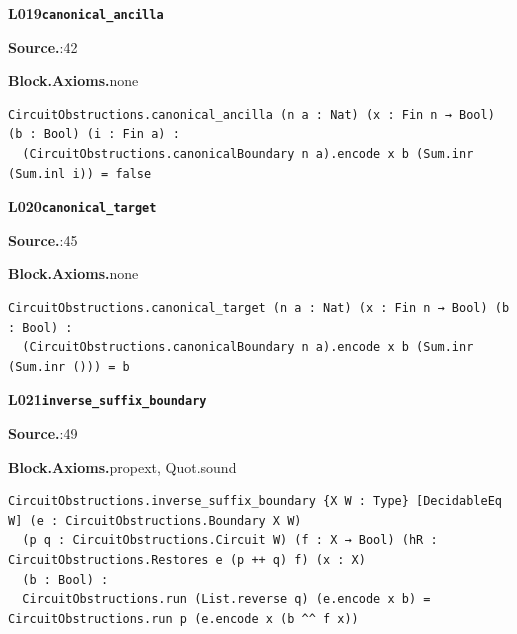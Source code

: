 \par\medskip\noindent\begin{minipage}{\textwidth}
{\small\bfseries L019\enspace\texttt{canonical\_ancilla}\par}
{\footnotesize\raggedright\textbf{Source.}\enspace{}:42\par
\textbf{Block.}\quad\textbf{Axioms.}\enspace none\par}\nopagebreak
\begin{lstlisting}
CircuitObstructions.canonical_ancilla (n a : Nat) (x : Fin n → Bool) (b : Bool) (i : Fin a) :
  (CircuitObstructions.canonicalBoundary n a).encode x b (Sum.inr (Sum.inl i)) = false
\end{lstlisting}
\end{minipage}\par

\par\medskip\noindent\begin{minipage}{\textwidth}
{\small\bfseries L020\enspace\texttt{canonical\_target}\par}
{\footnotesize\raggedright\textbf{Source.}\enspace{}:45\par
\textbf{Block.}\quad\textbf{Axioms.}\enspace none\par}\nopagebreak
\begin{lstlisting}
CircuitObstructions.canonical_target (n a : Nat) (x : Fin n → Bool) (b : Bool) :
  (CircuitObstructions.canonicalBoundary n a).encode x b (Sum.inr (Sum.inr ())) = b
\end{lstlisting}
\end{minipage}\par

\par\medskip\noindent\begin{minipage}{\textwidth}
{\small\bfseries L021\enspace\texttt{inverse\_suffix\_boundary}\par}
{\footnotesize\raggedright\textbf{Source.}\enspace{}:49\par
\textbf{Block.}\quad\textbf{Axioms.}\enspace propext, Quot.sound\par}\nopagebreak
\begin{lstlisting}
CircuitObstructions.inverse_suffix_boundary {X W : Type} [DecidableEq W] (e : CircuitObstructions.Boundary X W)
  (p q : CircuitObstructions.Circuit W) (f : X → Bool) (hR : CircuitObstructions.Restores e (p ++ q) f) (x : X)
  (b : Bool) :
  CircuitObstructions.run (List.reverse q) (e.encode x b) = CircuitObstructions.run p (e.encode x (b ^^ f x))
\end{lstlisting}
\end{minipage}\par

